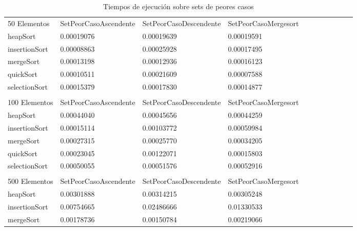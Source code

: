 \documentclass[article,a4paper]{article}
\begin{document}
\begin{table}[h]
\centering
\caption{Tiempos de ejecución sobre sets de peores casos}
\begin{adjustbox}{width=\textwidth,totalheight=\textheight,keepaspectratio}
\tiny
\begin{tabular}{lllllllllll}
50 Elementos    & SetPeorCasoAscendente & SetPeorCasoDescendente & SetPeorCasoMergesort \\
heapSort        & 0.00019076            & 0.00019639             & 0.00019591           \\
insertionSort   & 0.00008863            & 0.00025928             & 0.00017495           \\
mergeSort       & 0.00013198            & 0.00012936             & 0.00016123           \\
quickSort       & 0.00010511            & 0.00021609             & 0.00007588           \\
selectionSort   & 0.00015379            & 0.00017830             & 0.00014877           \\
                &                       &                        &                      \\
100 Elementos   & SetPeorCasoAscendente & SetPeorCasoDescendente & SetPeorCasoMergesort \\
heapSort        & 0.00044040            & 0.00045656             & 0.00044259           \\
insertionSort   & 0.00015114            & 0.00103772             & 0.00059984           \\
mergeSort       & 0.00027315            & 0.00025770             & 0.00034205           \\
quickSort       & 0.00023045            & 0.00122071             & 0.00015803           \\
selectionSort   & 0.00050055            & 0.00051576             & 0.00052916           \\
                &                       &                        &                      \\
500 Elementos   & SetPeorCasoAscendente & SetPeorCasoDescendente & SetPeorCasoMergesort \\
heapSort        & 0.00301888            & 0.00314215             & 0.00305248           \\
insertionSort   & 0.00754665            & 0.02486666             & 0.01330533           \\
mergeSort       & 0.00178736            & 0.00150784             & 0.00219066           \\

\end{tabular}
\end{adjustbox}
\end{table}
\end{document}
